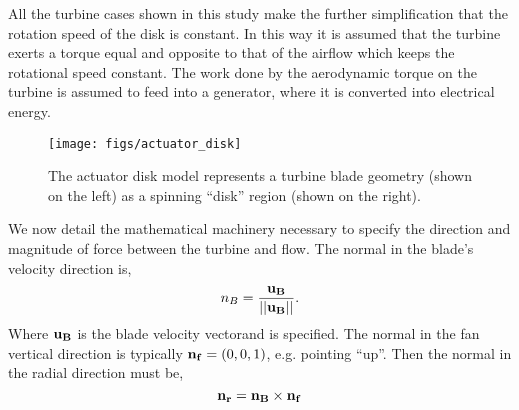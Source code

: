 All the turbine cases shown in this study make the further
simplification that the rotation speed of the disk is constant. 
In this way it is assumed that the turbine exerts a torque equal and
opposite to that of the airflow which keeps the rotational speed
constant. The work done by the aerodynamic torque on the
turbine is assumed to feed into a generator, where it is converted into
electrical energy. 


   \begin{figure}[!htb]
    \centering
    \texttt{[image: figs/actuator\_disk]}
     \caption{The actuator disk model represents a turbine blade
    geometry (shown on the left) as a spinning ``disk'' region (shown
    on the right).}
     \label{fig:actuator_disk}
   \end{figure}

We now detail the mathematical machinery necessary to specify the
direction and magnitude of force between the turbine and flow. The
normal in the blade's velocity direction is, 
\begin{equation*}
n_B = \frac{{\bf u_B}}{||{\bf u_B}||}. 
\end{equation*}
Where ${\bf u_B}$ is the blade velocity vectorand is specified. The
normal in the fan vertical direction is typically ${\bf n_f} =
\left(0,0,1\right)$, e.g. pointing ``up''. Then the normal in the radial
direction must be,  
\begin{equation*}
{\bf n_r} = {\bf n_B} \times {\bf n_f}
\end{equation*}



